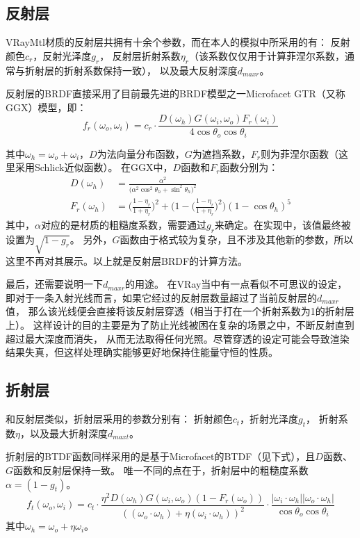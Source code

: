 \subsection{反射层}

VRayMtl材质的反射层共拥有十余个参数，而在本人的模拟中所采用的有：
反射颜色$c_{r}$，反射光泽度$g_r$，
反射层折射系数$\eta_{r}$（该系数仅仅用于计算菲涅尔系数，通常与折射层的折射系数保持一致），
以及最大反射深度$d_{maxr}$。

反射层的BRDF直接采用了目前最先进的BRDF模型之一Microfacet GTR（又称GGX）模型\cite{GTR}，即：
\begin{equation}
f_r(\omega_o, \omega_i) = c_r \cdot \frac{D(\omega_h)G(\omega_i,\omega_o)F_r(\omega_i)}{4\cos\theta_o\cos\theta_i} 
\end{equation}

其中$\omega_h=\omega_o+\omega_i$，$D$为法向量分布函数，$G$为遮挡系数，$F_r$则为菲涅尔函数（这里采用Schlick近似函数）。
在GGX中，$D$函数和$F_r$函数分别为：
\begin{align}
D(\omega_h) &= \frac{\alpha^2}{\Big(\alpha^2\cos^2\theta_h + \sin^2\theta_h\Big)^2}\\
F_r(\omega_h) &= \Big(\frac{1-\eta_r}{1+\eta_r}\Big)^2+\Big(1-\Big(\frac{1-\eta_r}{1+\eta_r}\Big)^2\Big)(1-\cos\theta_h)^5
\end{align}
其中，$\alpha$对应的是材质的粗糙度系数，需要通过$g_r$来确定。在实现中，该值最终被设置为$\sqrt{1-g_r}$。
另外，$G$函数由于格式较为复杂，且不涉及其他新的参数，所以这里不再对其展示。以上就是反射层BRDF的计算方法。

最后，还需要说明一下$d_{maxr}$的用途。
在VRay当中有一点看似不可思议的设定，即对于一条入射光线而言，如果它经过的反射层数量超过了当前反射层的$d_{maxr}$值，
那么该光线便会直接将该反射层穿透（相当于打在一个折射系数为1的折射层上）。
这样设计的目的主要是为了防止光线被困在复杂的场景之中，不断反射直到超过最大深度而消失，
从而无法取得任何光照。尽管穿透的设定可能会导致渲染结果失真，但这样处理确实能够更好地保持住能量守恒的性质。

\subsection{折射层}

和反射层类似，折射层采用的参数分别有：
折射颜色$c_t$，折射光泽度$g_t$，
折射系数$\eta$，以及最大折射深度$d_{maxt}$。

折射层的BTDF函数同样采用的是基于Microfacet的BTDF\cite{MicrofacetBTDF}（见下式），且$D$函数、$G$函数和反射层保持一致。
唯一不同的点在于，折射层中的粗糙度系数$\alpha=(1-g_t)$。
\begin{equation}
    f_t(\omega_o, \omega_i) = c_t \cdot \frac{\eta^2 D(\omega_h)G(\omega_i,\omega_o)(1-F_r(\omega_o))}{((\omega_o\cdot\omega_h) + \eta (\omega_i\cdot\omega_h))^2}\cdot \frac{|\omega_i\cdot\omega_h||\omega_o\cdot\omega_h|}{\cos\theta_o\cos\theta_i} 
\end{equation}
其中$\omega_h=\omega_o+\eta\omega_i$。

